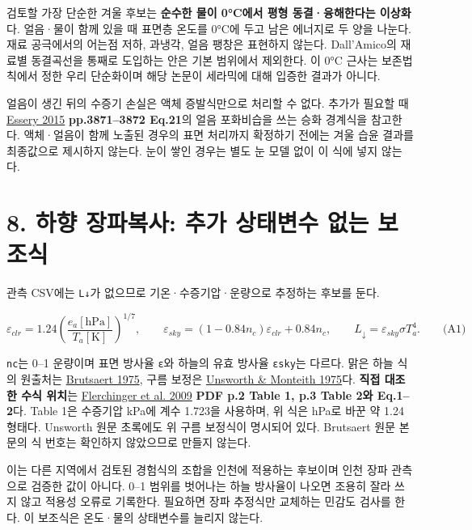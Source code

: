 \documentclass[11pt,a4paper]{article}
\begin{document}
검토할 가장 단순한 겨울 후보는 \textbf{순수한 물이 0°C에서 평형 동결·융해한다는 이상화}다. 얼음·물이 함께 있을 때 표면층 온도를 0°C에 두고 남은 에너지로 두 양을 나눈다. 재료 공극에서의 어는점 저하, 과냉각, 얼음 팽창은 표현하지 않는다. Dall'Amico의 재료별 동결곡선을 통째로 도입하는 안은 기본 범위에서 제외한다. 이 0°C 근사는 보존법칙에서 정한 우리 단순화이며 해당 논문이 세라믹에 대해 입증한 결과가 아니다.

얼음이 생긴 뒤의 수증기 손실은 액체 증발식만으로 처리할 수 없다. 추가가 필요할 때 \href{\detokenize{https://gmd.copernicus.org/articles/8/3867/2015/gmd-8-3867-2015.pdf}}{Essery 2015} \textbf{pp.3871–3872 Eq.21}의 얼음 포화비습을 쓰는 승화 경계식을 참고한다. 액체·얼음이 함께 노출된 경우의 표면 처리까지 확정하기 전에는 겨울 습윤 결과를 최종값으로 제시하지 않는다. 눈이 쌓인 경우는 별도 눈 모델 없이 이 식에 넣지 않는다.

\section{8. 하향 장파복사: 추가 상태변수 없는 보조식}

관측 CSV에는 \texttt{L↓}가 없으므로 기온·수증기압·운량으로 추정하는 후보를 둔다.

\begin{equation*}
\varepsilon_{clr}=1.24\left(\frac{e_a[\mathrm{hPa}]}{T_a[\mathrm K]}\right)^{1/7},\qquad
\varepsilon_{sky}=(1-0.84n_c)\varepsilon_{clr}+0.84n_c,\qquad
L_\downarrow=\varepsilon_{sky}\sigma T_a^4.\qquad\text{(A1)}
\end{equation*}

\texttt{nc}는 0–1 운량이며 표면 방사율 \texttt{ε}와 하늘의 유효 방사율 \texttt{εsky}는 다르다. 맑은 하늘 식의 원출처는 \href{\detokenize{https://doi.org/10.1029/WR011i005p00742}}{Brutsaert 1975}, 구름 보정은 \href{\detokenize{https://doi.org/10.1002/qj.49710142703}}{Unsworth \& Monteith 1975}다. \textbf{직접 대조한 수식 위치}는 \href{\detokenize{https://opus.lib.uts.edu.au/bitstream/10453/12351/1/2008006445OK.pdf}}{Flerchinger et al. 2009} \textbf{PDF p.2 Table 1, p.3 Table 2와 Eq.1–2}다. Table 1은 수증기압 kPa에 계수 1.723을 사용하며, 위 식은 hPa로 바꾼 약 1.24 형태다. Unsworth 원문 초록에도 위 구름 보정식이 명시되어 있다. Brutsaert 원문 본문의 식 번호는 확인하지 않았으므로 만들지 않는다.

이는 다른 지역에서 검토된 경험식의 조합을 인천에 적용하는 후보이며 인천 장파 관측으로 검증한 값이 아니다. 0–1 범위를 벗어나는 하늘 방사율이 나오면 조용히 잘라 쓰지 않고 적용성 오류로 기록한다. 필요하면 장파 추정식만 교체하는 민감도 검사를 한다. 이 보조식은 온도·물의 상태변수를 늘리지 않는다.
\end{document}
